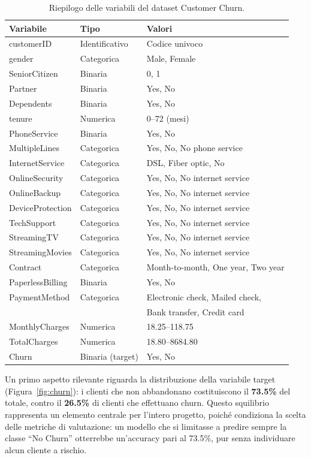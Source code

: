 \documentclass[11pt]{article}
\begin{document}
\begin{table}[h]
\centering
\caption{Riepilogo delle variabili del dataset Customer Churn.}
\label{tab:variabili}
\begin{tabular}{lll}
\hline
\textbf{Variabile} & \textbf{Tipo} & \textbf{Valori} \\
\hline
customerID & Identificativo & Codice univoco \\
gender & Categorica & Male, Female \\
SeniorCitizen & Binaria & 0, 1 \\
Partner & Binaria & Yes, No \\
Dependents & Binaria & Yes, No \\
tenure & Numerica & 0--72 (mesi) \\
PhoneService & Binaria & Yes, No \\
MultipleLines & Categorica & Yes, No, No phone service \\
InternetService & Categorica & DSL, Fiber optic, No \\
OnlineSecurity & Categorica & Yes, No, No internet service \\
OnlineBackup & Categorica & Yes, No, No internet service \\
DeviceProtection & Categorica & Yes, No, No internet service \\
TechSupport & Categorica & Yes, No, No internet service \\
StreamingTV & Categorica & Yes, No, No internet service \\
StreamingMovies & Categorica & Yes, No, No internet service \\
Contract & Categorica & Month-to-month, One year, Two year \\
PaperlessBilling & Binaria & Yes, No \\
PaymentMethod & Categorica & Electronic check, Mailed check, \\
 & & Bank transfer, Credit card \\
MonthlyCharges & Numerica & 18.25--118.75 \\
TotalCharges & Numerica & 18.80--8684.80 \\
Churn & Binaria (target) & Yes, No \\
\hline
\end{tabular}
\end{table}

Un primo aspetto rilevante riguarda la distribuzione della variabile target (Figura~\ref{fig:churn}): i clienti che non abbandonano costituiscono il \textbf{73.5\%} del totale, contro il \textbf{26.5\%} di clienti che effettuano churn. Questo squilibrio rappresenta un elemento centrale per l'intero progetto, poiché condiziona la scelta delle metriche di valutazione: un modello che si limitasse a predire sempre la classe ``No Churn'' otterrebbe un'accuracy pari al 73.5\%, pur senza individuare alcun cliente a rischio.
\end{document}
